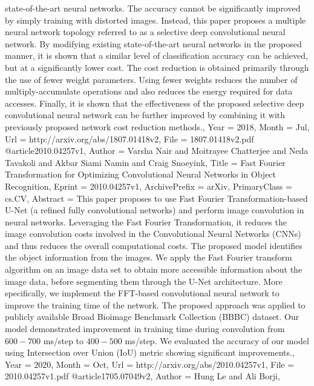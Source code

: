 {{{{{state-of-the-art neural networks. The accuracy cannot be significantly improved
by simply training with distorted images. Instead, this paper proposes a
multiple neural network topology referred to as a selective deep convolutional
neural network. By modifying existing state-of-the-art neural networks in the
proposed manner, it is shown that a similar level of classification accuracy
can be achieved, but at a significantly lower cost. The cost reduction is
obtained primarily through the use of fewer weight parameters. Using fewer
weights reduces the number of multiply-accumulate operations and also reduces
the energy required for data accesses. Finally, it is shown that the
effectiveness of the proposed selective deep convolutional neural network can
be further improved by combining it with previously proposed network cost
reduction methods.},
Year          = {2018},
Month         = {Jul},
Url           = {http://arxiv.org/abs/1807.01418v2},
File          = {1807.01418v2.pdf}
}
@article{2010.04257v1,
Author        = {Varsha Nair and Moitrayee Chatterjee and Neda Tavakoli and Akbar Siami Namin and Craig Snoeyink},
Title         = {Fast Fourier Transformation for Optimizing Convolutional Neural Networks
  in Object Recognition},
Eprint        = {2010.04257v1},
ArchivePrefix = {arXiv},
PrimaryClass  = {cs.CV},
Abstract      = {This paper proposes to use Fast Fourier Transformation-based U-Net (a refined
fully convolutional networks) and perform image convolution in neural networks.
Leveraging the Fast Fourier Transformation, it reduces the image convolution
costs involved in the Convolutional Neural Networks (CNNs) and thus reduces the
overall computational costs. The proposed model identifies the object
information from the images. We apply the Fast Fourier transform algorithm on
an image data set to obtain more accessible information about the image data,
before segmenting them through the U-Net architecture. More specifically, we
implement the FFT-based convolutional neural network to improve the training
time of the network. The proposed approach was applied to publicly available
Broad Bioimage Benchmark Collection (BBBC) dataset. Our model demonstrated
improvement in training time during convolution from $600-700$ ms/step to
$400-500$ ms/step. We evaluated the accuracy of our model using Intersection
over Union (IoU) metric showing significant improvements.},
Year          = {2020},
Month         = {Oct},
Url           = {http://arxiv.org/abs/2010.04257v1},
File          = {2010.04257v1.pdf}
}
@article{1705.07049v2,
Author        = {Hung Le and Ali Borji},
}}}}
